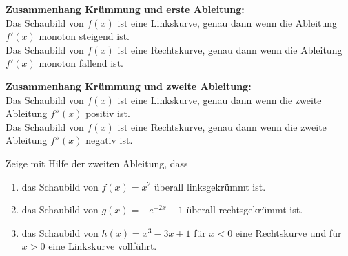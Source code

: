\begin{minipage}{\textwidth}
\end{minipage}
\begin{tcolorbox}
	\textbf{Zusammenhang Krümmung und erste Ableitung:}\\
	\textcolor{loestc}{Das Schaubild von \(f(x)\) ist eine Linkskurve, genau dann wenn die Ableitung \(f'(x)\) monoton steigend ist.\\
		Das Schaubild von \(f(x)\) ist eine Rechtskurve, genau dann wenn die Ableitung \(f'(x)\) monoton fallend ist.\\}
\end{tcolorbox}
\begin{tcolorbox}
	\textbf{Zusammenhang Krümmung und zweite Ableitung:}\\
	\textcolor{loestc}{Das Schaubild von \(f(x)\) ist eine Linkskurve, genau dann wenn die zweite Ableitung \(f''(x)\) positiv ist.\\
		Das Schaubild von \(f(x)\) ist eine Rechtskurve, genau dann wenn die zweite Ableitung \(f''(x)\) negativ ist.\\}
\end{tcolorbox}
Zeige mit Hilfe der zweiten Ableitung, dass
\begin{enumerate}
	\item das Schaubild von \(f(x)=x^2\) überall linksgekrümmt ist.
	\item das Schaubild von \(g(x)=-e^{-2x}-1\) überall rechtsgekrümmt ist.
	\item das Schaubild von \(h(x)=x^3-3x+1\) für \(x<0\) eine Rechtskurve und für \(x>0\) eine Linkskurve vollführt.
\end{enumerate}
